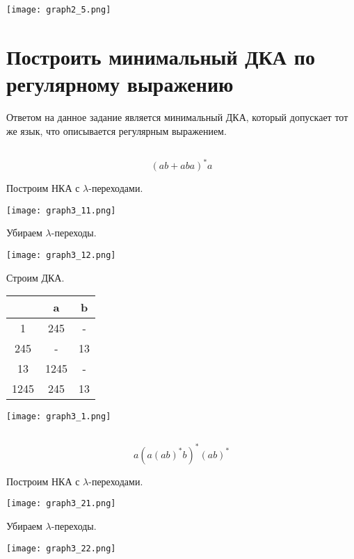 \documentclass[a4paper, 12pt]{article}
\begin{document}
\begin{center}
    \texttt{[image: graph2\_5.png]}
\end{center}

\newpage
\section{Построить минимальный ДКА по регулярному выражению}
Ответом на данное задание является минимальный ДКА, который допускает тот же язык, что описывается регулярным выражением.
\subsection{}
$$(ab + aba)^*a$$

Построим НКА с $\lambda$-переходами.
\begin{center}
    \texttt{[image: graph3\_11.png]}
\end{center}
\newpage

Убираем $\lambda$-переходы.
\begin{center}
    \texttt{[image: graph3\_12.png]}
\end{center}
Строим ДКА.


\begin{center}
 \begin{tabular}{|c|c|c|}
\hline
     & a    & b  \\ \hline
1    & 245  & -  \\ \hline
245  & -    & 13 \\ \hline
13   & 1245 & -  \\ \hline
1245 & 245  & 13 \\ \hline
\end{tabular}
\texttt{[image: graph3\_1.png]}
\end{center}

\newpage
\subsection{}
$$a(a(ab)^*b)^*(ab)^*$$

Построим НКА с $\lambda$-переходами.
\begin{center}
    \texttt{[image: graph3\_21.png]}
\end{center}

Убираем $\lambda$-переходы.
\begin{center}
    \texttt{[image: graph3\_22.png]}
\end{center}
\end{document}
